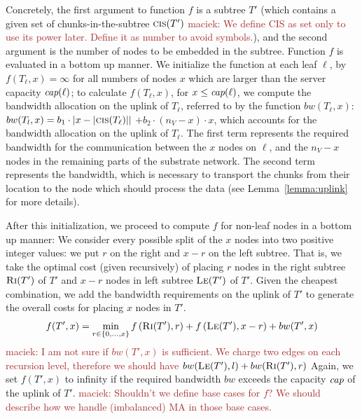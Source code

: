 \documentclass[9pt]{sigcomm-alternate}
\newcommand{\carlo}[1]{\textcolor{red}{carlo: #1}}
\newcommand{\maciek}[1]{\textcolor{brown}{maciek: #1}}
\newcommand{\ChunkCount}{\ensuremath{\textsc{cis}}}
\newcommand{\capacity}{\emph{cap}}
\newcommand{\Tree}{\ensuremath{T}}
\newcommand{\CostTrans}{\ensuremath{b_1}}
\newcommand{\CostCom}{\ensuremath{b_2}}
\newcommand{\Vms}{\ensuremath{n_V}}
\begin{document}
Concretely, the first argument to function $f$
is a subtree $\Tree'$ (which contains a given set of chunks-in-the-subtree $\ChunkCount(\Tree')$ \maciek{We define CIS as set only to use its power later. Define it as number to avoid symbols.}),
and the
second argument is the number of nodes to be embedded in the subtree.
Function $f$ is evaluated in a bottom up manner. We initialize the
function at each leaf $\ell$, by $f(T_{\ell},x) =
\infty$ for all numbers of nodes $x$ which are larger than
the server capacity $\capacity(\ell)$;
to calculate $f(T_{\ell}, x)$, for $x \leq \capacity(\ell)$, we compute the
bandwidth allocation on the uplink of $T_{\ell}$, referred to by the function
$bw(T_{\ell},x)$: $bw(T_l,x)=  \CostTrans \cdot |x - |\ChunkCount(T_{\ell})||$ $
+ \CostCom \cdot (\Vms - x) \cdot x$,
which accounts for the bandwidth allocation on the uplink of $T_{\ell}$. The first
term represents the required bandwidth for the communication between the $x$
nodes on $\ell$, and the $\Vms - x$ nodes in the remaining parts of the substrate
network.
The second term represents
the bandwidth, which is necessary to transport the chunks from their location to
the node which should process the data (see Lemma~\ref{lemma:uplink} for more
details).

After this initialization, we proceed to compute $f$ for non-leaf
nodes in a bottom up manner: We consider every possible split of the $x$ nodes
into two positive integer
values: we put $r$ on the right and $x - r$ on the left subtree.
That is, we take the optimal cost
(given recursively) of placing $r$ nodes in
the right subtree $\textsc{Ri}(T')$ of $T'$ and $x-r$ nodes in left subtree $\textsc{Le}(T')$ of
$T'$. Given the cheapest combination, we add the bandwidth requirements
on the uplink of $T'$ to generate the overall costs for placing $x$ nodes in $T'$.
$$f(T',x) =   \min_{r \in \{0, \ldots, x\}}  f\left(\textsc{Ri}(T'), r\right) +
f\left(\textsc{Le}(T'), x - r\right) + bw(T',x)$$
\maciek{I am not sure if $bw(T',x)$ is sufficient. We charge two edges on each recursion level, therefore we should have $bw(\textsc{Le}(T'),l)+bw(\textsc{Ri}(T'),r)$}
Again, we set $f(T',x)$ to infinity if the required bandwidth
$bw$ exceeds the capacity $\capacity$ of the uplink of $T'$.
\maciek{Shouldn't we define base cases for $f$? We should describe how we handle (imbalanced) MA in those base cases.}
\end{document}
